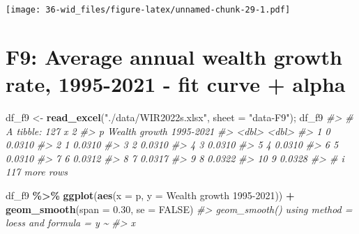 \documentclass[
  xelatex, ja=standard]{bxjsbook}
\newenvironment{Shaded}{\begin{snugshade}}{\end{snugshade}}
\newcommand{\AttributeTok}[1]{\textcolor[rgb]{0.13,0.29,0.53}{#1}}
\newcommand{\CommentTok}[1]{\textcolor[rgb]{0.56,0.35,0.01}{\textit{#1}}}
\newcommand{\ConstantTok}[1]{\textcolor[rgb]{0.56,0.35,0.01}{#1}}
\newcommand{\FloatTok}[1]{\textcolor[rgb]{0.00,0.00,0.81}{#1}}
\newcommand{\FunctionTok}[1]{\textcolor[rgb]{0.13,0.29,0.53}{\textbf{#1}}}
\newcommand{\NormalTok}[1]{#1}
\newcommand{\OtherTok}[1]{\textcolor[rgb]{0.56,0.35,0.01}{#1}}
\newcommand{\SpecialCharTok}[1]{\textcolor[rgb]{0.81,0.36,0.00}{\textbf{#1}}}
\newcommand{\StringTok}[1]{\textcolor[rgb]{0.31,0.60,0.02}{#1}}
\theoremstyle{definition}
\theoremstyle{definition}
\theoremstyle{definition}
\theoremstyle{definition}
\theoremstyle{remark}
\begin{document}
\texttt{[image: 36-wid\_files/figure-latex/unnamed-chunk-29-1.pdf]}

\hypertarget{f9-average-annual-wealth-growth-rate-1995-2021---fit-curve-alpha}{%
\section{F9: Average annual wealth growth rate, 1995-2021 - fit curve + alpha}\label{f9-average-annual-wealth-growth-rate-1995-2021---fit-curve-alpha}}

\begin{Shaded}
\begin{Highlighting}[]
\NormalTok{df\_f9 }\OtherTok{\textless{}{-}} \FunctionTok{read\_excel}\NormalTok{(}\StringTok{"./data/WIR2022s.xlsx"}\NormalTok{, }\AttributeTok{sheet =} \StringTok{"data{-}F9"}\NormalTok{); df\_f9}
\CommentTok{\#\textgreater{} \# A tibble: 127 x 2}
\CommentTok{\#\textgreater{}        p \textasciigrave{}Wealth growth 1995{-}2021\textasciigrave{}}
\CommentTok{\#\textgreater{}    \textless{}dbl\textgreater{}                     \textless{}dbl\textgreater{}}
\CommentTok{\#\textgreater{}  1     0                    0.0310}
\CommentTok{\#\textgreater{}  2     1                    0.0310}
\CommentTok{\#\textgreater{}  3     2                    0.0310}
\CommentTok{\#\textgreater{}  4     3                    0.0310}
\CommentTok{\#\textgreater{}  5     4                    0.0310}
\CommentTok{\#\textgreater{}  6     5                    0.0310}
\CommentTok{\#\textgreater{}  7     6                    0.0312}
\CommentTok{\#\textgreater{}  8     7                    0.0317}
\CommentTok{\#\textgreater{}  9     8                    0.0322}
\CommentTok{\#\textgreater{} 10     9                    0.0328}
\CommentTok{\#\textgreater{} \# i 117 more rows}
\end{Highlighting}
\end{Shaded}

\begin{Shaded}
\begin{Highlighting}[]
\NormalTok{df\_f9 }\SpecialCharTok{\%\textgreater{}\%} 
  \FunctionTok{ggplot}\NormalTok{(}\FunctionTok{aes}\NormalTok{(}\AttributeTok{x =}\NormalTok{ p, }\AttributeTok{y =} \StringTok{\textasciigrave{}}\AttributeTok{Wealth growth 1995{-}2021}\StringTok{\textasciigrave{}}\NormalTok{)) }\SpecialCharTok{+} \FunctionTok{geom\_smooth}\NormalTok{(}\AttributeTok{span =} \FloatTok{0.30}\NormalTok{, }\AttributeTok{se =} \ConstantTok{FALSE}\NormalTok{)}
\CommentTok{\#\textgreater{} \textasciigrave{}geom\_smooth()\textasciigrave{} using method = \textquotesingle{}loess\textquotesingle{} and formula = \textquotesingle{}y \textasciitilde{}}
\CommentTok{\#\textgreater{} x\textquotesingle{}}
\end{Highlighting}
\end{Shaded}
\end{document}
